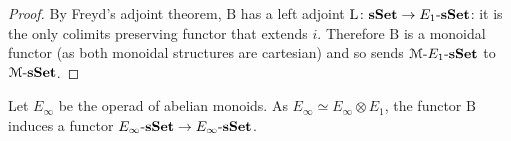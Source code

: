 \begin{refsection}
\begin{proof}
By Freyd's adjoint theorem, $\mathrm{B}$ has a left adjoint $\mathrm{L} \colon \mathbf{s\,\!\mathbf{Set}} \to E_1 \textrm{-} \mathbf{s\,\!\mathbf{Set}}$: it is the only colimits preserving functor that extends $i$. Therefore $\mathrm{B}$ is a monoidal functor (as both monoidal structures are cartesian) and so sends $\mathcal{M} \textrm{-} E_1 \textrm{-} \mathbf{s\,\!\mathbf{Set}}$ to $\mathcal{M} \textrm{-} \mathbf{s\,\!\mathbf{Set}}$.
\end{proof}

\begin{corollary}
Let $E_{\infty}$ be the operad of abelian monoids. As $E_{\infty} \simeq E_{\infty} \otimes E_1$, the functor $\mathrm{B}$ induces a functor $E_{\infty} \textrm{-} \mathbf{s\,\!\mathbf{Set}} \to E_{\infty} \textrm{-} \mathbf{s\,\!\mathbf{Set}}$.
\end{corollary}

\printbibliography[heading = local]

\end{refsection}

\renewcommand{\thesection}{\thechapter.\arabic{section}}
